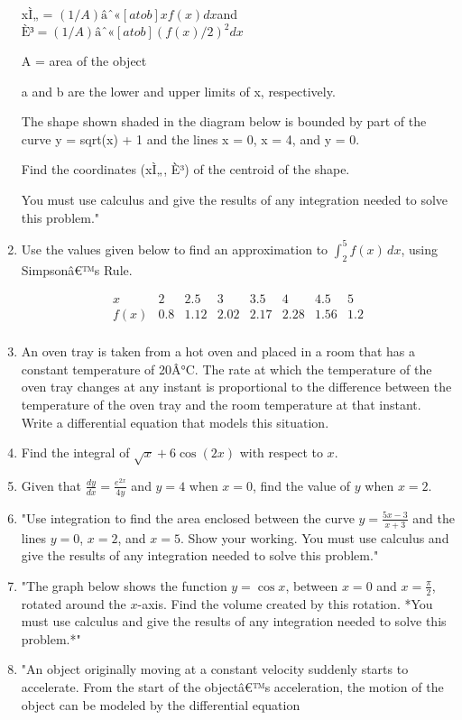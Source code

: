 \documentclass{article}
\begin{document}
\begin{enumerate}
xÌ„ = \((1/A) âˆ«[a to b] x f(x) dx \)and \(È³ = (1/A) âˆ«[a to b] (f(x)/2)^2 dx\)

A = area of the object

a and b are the lower and upper limits of x, respectively.

The shape shown shaded in the diagram below is bounded by part of the curve y = sqrt(x) + 1 and the lines x = 0, x = 4, and y = 0.

Find the coordinates (xÌ„, È³) of the centroid of the shape.

You must use calculus and give the results of any integration needed to solve this problem."
\vspace{3cm}
\item Use the values given below to find an approximation to \(\int_{2}^{5} f(x) \, dx\), using Simpsonâ€™s Rule.

\[
\begin{array}{c|ccccccc}
x & 2 & 2.5 & 3 & 3.5 & 4 & 4.5 & 5 \\
\hline
f(x) & 0.8 & 1.12 & 2.02 & 2.17 & 2.28 & 1.56 & 1.2 \\
\end{array}
\]
\vspace{3cm}
\item An oven tray is taken from a hot oven and placed in a room that has a constant temperature of 20Â°C. The rate at which the temperature of the oven tray changes at any instant is proportional to the difference between the temperature of the oven tray and the room temperature at that instant. Write a differential equation that models this situation.
\vspace{3cm}
\item Find the integral of \(\sqrt{x} + 6 \cos(2x)\) with respect to \(x\).
\vspace{3cm}
\item Given that \(\frac{dy}{dx} = \frac{e^{2x}}{4y}\) and \(y = 4\) when \(x = 0\), find the value of \(y\) when \(x = 2\).
\vspace{3cm}
\item "Use integration to find the area enclosed between the curve \( y = \frac{5x - 3}{x + 3} \) and the lines \( y = 0 \), \( x = 2 \), and \( x = 5 \). Show your working. You must use calculus and give the results of any integration needed to solve this problem."
\vspace{3cm}
\item "The graph below shows the function \( y = \cos x \), between \( x = 0 \) and \( x = \frac{\pi}{2} \), rotated around the \( x \)-axis. Find the volume created by this rotation. *You must use calculus and give the results of any integration needed to solve this problem.*"
\vspace{3cm}
\item "An object originally moving at a constant velocity suddenly starts to accelerate. From the start of the objectâ€™s acceleration, the motion of the object can be modeled by the differential equation


\end{enumerate}
\end{document}

